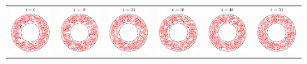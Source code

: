 \begin{figure}[htp]
\centering
\begin{tabular}{cccccc}
\includegraphics{figs/couette150SnapsTime1.pdf} &
\includegraphics{figs/couette150SnapsTime2.pdf} &
\includegraphics{figs/couette150SnapsTime3.pdf} &
\includegraphics{figs/couette150SnapsTime4.pdf} &
\includegraphics{figs/couette150SnapsTime5.pdf} &
\includegraphics{figs/couette150SnapsTime6.pdf}

\end{tabular}
\end{figure}
